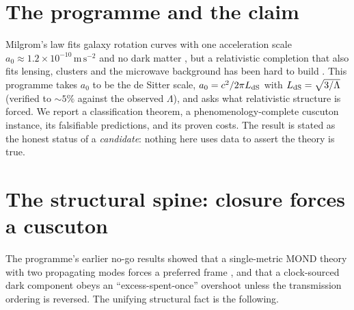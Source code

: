 \documentclass[11pt,letterpaper]{article}
\newcommand{\ms}{\,\mathrm{m\,s^{-2}}}
\begin{document}
\begin{abstract}
baryonic-Tully--Fisher zero-point of $0.00$~dex vs.\ $+0.33$~dex for $\Lambda$CDM), an External Field Effect
in dwarf-spheroidal dispersions ($\sim\!1.9\times$ across Galactocentric radius, where dark matter predicts
none), a subdominant near-luminal scalar gravitational-wave polarization, a dark matter that cannot decay or
annihilate, and a parameter-free $1/r$ correction above the flat rotation velocity. \textbf{We do not claim
the theory is established.} Two costs are proved and stated: the charge-sourced dark matter carries an
\emph{intrinsic} $\sim\!24$-order Big-Bang-Nucleosynthesis fine-tuning (the same conserved charge sources an
$a^{-6}$ stiff partner, and the ghost-free degeneracy forbids removing it), and the full relativistic
constraint algebra of the completion is still being derived. This is the honest state of a candidate: a
consistent structural class, a phenomenology-complete instance, sharp predictions that data can confirm or
kill, and named open costs. Every dimensional number is carried on both $a_0$ footings. AI-assisted research
draft; not peer reviewed.
\end{abstract}

\section{The programme and the claim}
Milgrom's law fits galaxy rotation curves with one acceleration scale $a_0\approx1.2\times10^{-10}\ms$ and no
dark matter \cite{Milgrom1983}, but a relativistic completion that also fits lensing, clusters and the
microwave background has been hard to build \cite{BekensteinMilgrom1984,SkordisZlosnik2021}. This programme
takes $a_0$ to be the de Sitter scale, $a_0=c^2/2\pi L_{\rm dS}$ with $L_{\rm dS}=\sqrt{3/\Lambda}$ (verified
to $\sim\!5\%$ against the observed $\Lambda$), and asks what relativistic structure is forced. We report a
classification theorem, a phenomenology-complete cuscuton instance, its falsifiable predictions, and its
proven costs. The result is stated as the honest status of a \emph{candidate}: nothing here uses data to
assert the theory is true.

\section{The structural spine: closure forces a cuscuton}
The programme's earlier no-go results showed that a single-metric MOND theory with two propagating modes
forces a preferred frame \cite{Zimmerman2026foliation}, and that a clock-sourced dark component obeys an
``excess-spent-once'' overshoot unless the transmission ordering is reversed. The unifying structural fact is
the following.
\end{document}
